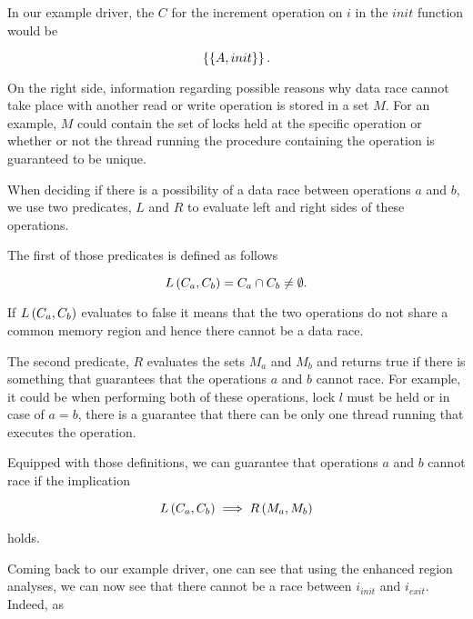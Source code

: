 \documentclass[..thesis.tex]{subfiles}
\begin{document}
In our example driver, the $C$ for the increment operation on $i$ in the $init$ function would be 


\begin{equation*}
\left\lbrace \left\lbrace A, init \right\rbrace \right\rbrace \text{.}
\end{equation*} 

On the right side, information regarding possible reasons why data race cannot take place with another read or write operation is stored in a set $M$.
For an example, $M$ could contain the set of locks held at the specific operation or whether or not the thread running the procedure containing the operation is guaranteed to be unique.

When deciding if there is a possibility of a data race between operations $a$ and $b$, we use two predicates, $L$ and $R$ to evaluate left and right sides of these operations. 


The first of those predicates is defined as follows

\begin{equation*}
L \left( C_a, C_b \right) =  C_a \cap C_b \neq \emptyset \text{.}
\end{equation*}

If $L \left( C_a, C_b \right)$ evaluates to false it means that the two operations do not share a common memory region and hence there cannot be a data race. 

The second predicate, $R$ evaluates the sets $M_a$ and $M_b$ and returns true if there is something that guarantees that the operations $a$ and $b$ cannot race.
 For example, it could be when performing both of these operations, lock $l$ must be held or in case of $a=b$,
 there is a guarantee that there can be only one thread running that executes the operation.

Equipped with those definitions, we can guarantee that operations $a$ and $b$ cannot race if the implication

\begin{equation}
\label{implication}
L \left( C_a, C_b \right) \implies R \left( M_a, M_b \right)  
\end{equation}

holds.

Coming back to our example driver, one can see that using the enhanced region analyses, we can now see that there cannot be a race between $i_{init}$ and $i_{exit}$.
Indeed, as
\end{document}
